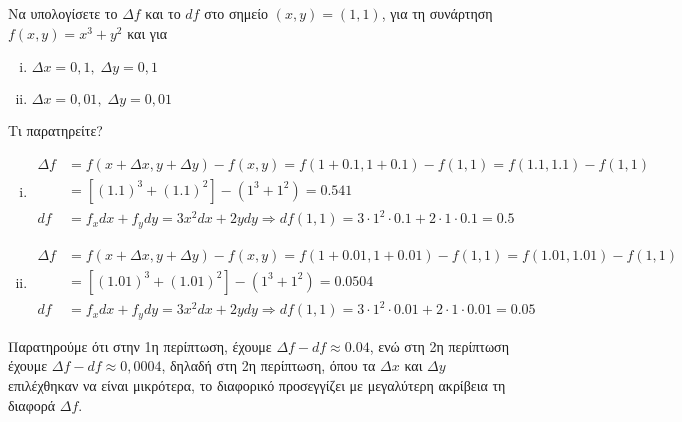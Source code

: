     \begin{example}
      Να υπολογίσετε το $ \Delta f $ και το $ df $ στο σημείο $ (x,y) = (1,1) $, 
      για τη συνάρτηση $ f(x,y) = x^{3}+y^{2} $ και για 
      \begin{enumerate}[i)]
        \item $ \Delta x = 0,1, \; \Delta y = 0,1 $
        \item $ \Delta x = 0,01, \; \Delta y = 0,01 $
      \end{enumerate}
      Τι παρατηρείτε?
    \end{example}
    \begin{solution}
    \item {}
      \begin{enumerate}[i)]
        \item 
          \begin{align*} 
            \Delta f &= f(x+ \Delta x, y + \Delta y) - f(x,y) = f(1+0.1,1+0.1) - 
            f(1,1) = f(1.1,1.1) - f(1,1) \\ 
                     &= [(1.1)^{3}+(1.1)^{2}] - (1^{3}+1^{2}) = 0.541 \\
            df &= f_{x}dx + f_{y}dy  = 3x^{2} dx + 2y dy \Rightarrow df (1,1) = 
            3\cdot 1^{2} \cdot 0.1 + 2 \cdot 1 \cdot 0.1 = 0.5 
          \end{align*}
        \item 
          \begin{align*} 
            \Delta f &= f(x+ \Delta x, y + \Delta y) - f(x,y) = f(1+0.01,1+0.01) - 
            f(1,1) = f(1.01,1.01) - f(1,1) \\ 
                     &= [(1.01)^{3}+(1.01)^{2}] - (1^{3}+1^{2}) = 0.0504 \\
            df &= f_{x}dx + f_{y}dy  = 3x^{2} dx + 2y dy \Rightarrow df (1,1) = 
            3\cdot 1^{2} \cdot 0.01 + 2 \cdot 1 \cdot 0.01 = 0.05 
          \end{align*}
      \end{enumerate}
      Παρατηρούμε ότι στην 1η περίπτωση, έχουμε
      $ \Delta f - df \approx 0.04 $, ενώ στη 2η περίπτωση έχουμε $ \Delta f - df \approx 
      0,0004 $, δηλαδή στη 2η περίπτωση, όπου τα $ \Delta x $ και $ \Delta y $ επιλέχθηκαν 
      να είναι μικρότερα, το διαφορικό προσεγγίζει με μεγαλύτερη ακρίβεια τη διαφορά 
      $ \Delta f $.
    \end{solution}

